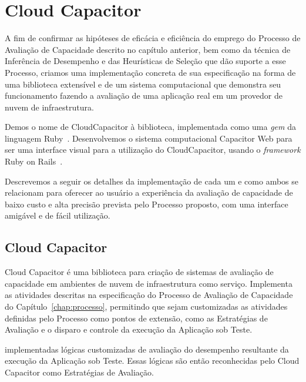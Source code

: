 \chapter{Cloud Capacitor}
\label{chap:capacitor}
A fim de confirmar as hipóteses de eficácia e eficiência do emprego do Processo
de Avaliação de Capacidade descrito no capítulo anterior, bem como da técnica de
Inferência de Desempenho e das Heurísticas de Seleção que dão suporte a esse Processo, 
criamos uma implementação concreta de sua especificação na forma de uma biblioteca
extensível e de um sistema computacional que demonstra seu funcionamento fazendo
a avaliação de uma aplicação real em um provedor de nuvem de infraestrutura.

Demos o nome de CloudCapacitor à biblioteca, implementada como uma \emph{gem} da
linguagem Ruby~\cite{ruby}. Desenvolvemos o sistema computacional Capacitor Web 
para ser uma interface visual para a utilização do CloudCapacitor, usando 
o \emph{framework} Ruby on Rails~\cite{rails}.  

Descrevemos a seguir os detalhes da implementação de cada um e como ambos se
relacionam para oferecer ao usuário a experiência da avaliação de capacidade
de baixo custo e alta precisão prevista pelo Processo proposto, com uma interface
amigável e de fácil utilização.

\section{Cloud Capacitor}
Cloud Capacitor é uma biblioteca para criação de sistemas de avaliação de 
capacidade em ambientes de nuvem de infraestrutura como serviço. Implementa as
atividades descritas na especificação do Processo de Avaliação de Capacidade do 
Capítulo~\ref{chap:processo}, permitindo que sejam customizadas as atividades
definidas pelo Processo como pontos de extensão, como as Estratégias de Avaliação
e o disparo e controle da execução da Aplicação sob Teste.

implementadas lógicas customizadas de avaliação do desempenho resultante
da execução da Aplicação sob Teste. Essas lógicas são então reconhecidas pelo Cloud 
Capacitor como Estratégias de Avaliação.

